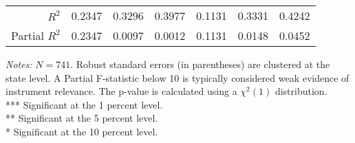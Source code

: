 \begin{frame}
\begin{table}[ht]
{\begin{tabular}{rcccccc}
                \cmidrule(lr){1-1} \cmidrule(lr){2-4} \cmidrule(lr){5-7} 
                $R^2$                                                         & 0.2347          & 0.3296          & 0.3977          & 0.1131         & 0.3331          & 0.4242          \\
                Partial $R^2$                                                 & 0.2347          & 0.0097          & 0.0012          & 0.1131         & 0.0148          & 0.0452          \\
                \bottomrule
            \end{tabular}
        }
        \vspace{0.2cm}
        
        \begin{minipage}{\linewidth}
            \tiny
            \textit{Notes:} $N = 741$. Robust standard errors (in parentheses) are clustered at the state level. A Partial F-statistic below 10 is typically considered weak evidence of instrument relevance. The p-value is calculated using a $\chi^2(1)$ distribution. \\
            *** Significant at the 1 percent level. \\
            ** Significant at the 5 percent level. \\
            * Significant at the 10 percent level.
        \end{minipage}
    \end{table}

\end{frame}
